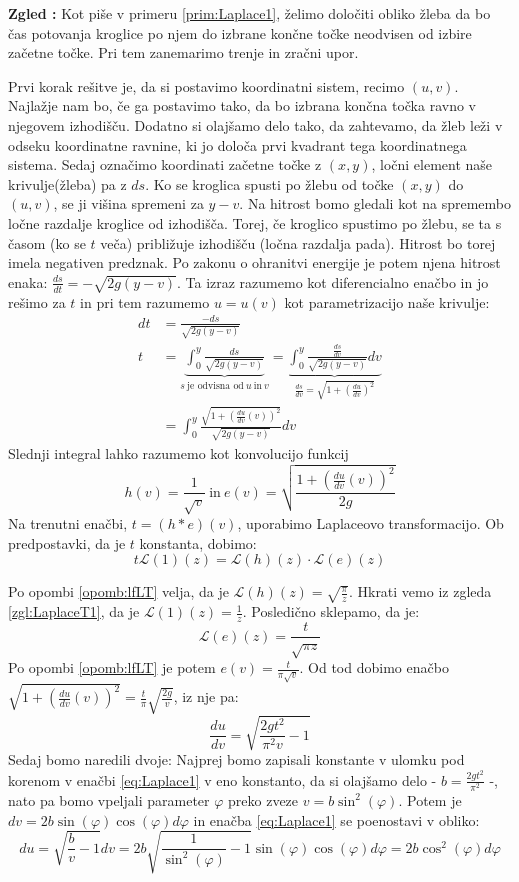 \documentclass[a4paper, 10pt]{article}
\newcounter{zgledcount}
\newenvironment{zgled}{\begin{flushleft}\refstepcounter{zgledcount}\textbf{Zgled \arabic{zgledcount}:}}{\hfill\end{flushleft}}
\begin{document}
			\begin{zgled}
				Kot piše v primeru \ref{prim:Laplace1}, želimo določiti obliko žleba da bo čas potovanja kroglice po njem do izbrane končne točke neodvisen od izbire začetne točke. Pri tem zanemarimo trenje in zračni upor.
				
				Prvi korak rešitve je, da si postavimo koordinatni sistem, recimo $(u, v)$. Najlažje nam bo, če ga postavimo tako, da bo izbrana končna točka ravno v njegovem izhodišču. Dodatno si olajšamo delo tako, da zahtevamo, da žleb leži v odseku koordinatne ravnine, ki jo določa prvi kvadrant tega koordinatnega sistema. Sedaj označimo koordinati začetne točke z $(x, y)$, ločni element naše krivulje(žleba) pa z $ds$. Ko se kroglica spusti po žlebu od točke $(x, y)$ do $(u, v)$, se ji višina spremeni za $y-v$. Na hitrost bomo gledali kot na spremembo ločne razdalje kroglice od izhodišča. Torej, če kroglico spustimo po žlebu, se ta s časom (ko se $t$ veča) približuje izhodišču (ločna razdalja pada). Hitrost bo torej imela negativen predznak. Po zakonu o ohranitvi energije je potem njena hitrost enaka: $\frac{ds}{dt} = -\sqrt{2g(y-v)}$. Ta izraz razumemo kot diferencialno enačbo in jo rešimo za $t$ in pri tem razumemo $u = u(v)$ kot parametrizacijo naše krivulje: \begin{align*}
					dt &= \frac{-ds}{\sqrt{2g(y-v)}} \\
					t &= \underbrace{\int_{0}^{y}\frac{ds}{\sqrt{2g(y-v)}}}_{s~\text{je odvisna od}~u~\text{in}~v} = \underbrace{\int_{0}^{y}\frac{\frac{ds}{dv}}{\sqrt{2g(y-v)}}dv}_{\frac{ds}{dv} = \sqrt{1 + (\frac{du}{dv})^2}} \\ 
					&= \int_{0}^{y}\frac{\sqrt{1 + (\frac{du}{dv}(v))^2}}{\sqrt{2g(y-v)}}dv
				\end{align*}
				Slednji integral lahko razumemo kot konvolucijo funkcij $$h(v) = \frac{1}{\sqrt{v}}~\text{in}~e(v) = \sqrt{\frac{1 + (\frac{du}{dv}(v))^2}{2g}}$$
				Na trenutni enačbi, $t = (h*e)(v)$, uporabimo Laplaceovo transformacijo. Ob predpostavki, da je $t$ konstanta, dobimo: $$t\mathcal{L}(1)(z)=\mathcal{L}(h)(z)\cdot\mathcal{L}(e)(z) $$
				
				Po opombi \ref{opomb:lfLT} velja, da je $\mathcal{L}(h)(z) = \sqrt{\frac{\pi}{z}}$. Hkrati vemo iz zgleda \ref{zgl:LaplaceT1}, da je $\mathcal{L}(1)(z) = \frac{1}{z}$. Posledično sklepamo, da je: $$\mathcal{L}(e)(z) = \frac{t}{\sqrt{\pi z}}$$
				Po opombi \ref{opomb:lfLT} je potem $e(v)=\frac{t}{\pi\sqrt{v}}$. Od tod dobimo enačbo $ \sqrt{1 + (\frac{du}{dv}(v))^2} = \frac{t}{\pi}\sqrt{\frac{2g}{v}}$, iz nje pa: \begin{equation}
					\label{eq:Laplace1}
					\frac{du}{dv} = \sqrt{\frac{2gt^2}{\pi^2v}-1}
				\end{equation}
				Sedaj bomo naredili dvoje: Najprej bomo zapisali konstante v ulomku pod korenom v enačbi \ref{eq:Laplace1} v eno konstanto, da si olajšamo delo - $b = \frac{2gt^2}{\pi^2}$ -, nato pa bomo vpeljali parameter $\varphi$ preko zveze $v = b\sin^2(\varphi)$. Potem je $dv = 2b\sin(\varphi)\cos(\varphi)d\varphi$ in enačba \ref{eq:Laplace1} se poenostavi v obliko: $$du = \sqrt{\frac{b}{v}-1}dv = 2b\sqrt{\frac{1}{\sin^2(\varphi)}-1}\sin(\varphi)\cos(\varphi)d\varphi = 2b\cos^2(\varphi)d\varphi$$
				

\end{zgled}
\end{document}
